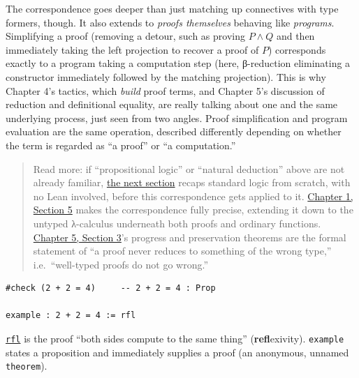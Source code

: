 The correspondence goes deeper than just matching up connectives with type formers, though. It also extends to \emph{proofs themselves} behaving like \emph{programs}. Simplifying a proof (removing a detour, such as proving \(P \wedge Q\) and then immediately taking the left projection to recover a proof of \(P\)) corresponds exactly to a program taking a computation step (here, β-reduction eliminating a constructor immediately followed by the matching projection). This is why Chapter 4's tactics, which \emph{build} proof terms, and Chapter 5's discussion of reduction and definitional equality, are really talking about one and the same underlying process, just seen from two angles. Proof simplification and program evaluation are the same operation, described differently depending on whether the term is regarded as ``a proof'' or ``a computation.''

\begin{quote}
Read more: if ``propositional logic'' or ``natural deduction'' above are not already familiar, \hyperref[sec:03-propositions-and-proofs:02-logic-recap:1]{the next section} recaps standard logic from scratch, with no Lean involved, before this correspondence gets applied to it. \hyperref[sec:01-basics:05-pi-sigma-and-coc:1]{Chapter 1, Section 5} makes the correspondence fully precise, extending it down to the untyped λ-calculus underneath both proofs and ordinary functions. \hyperref[sec:05-rigor-check:03-typing-rules-and-safety:1]{Chapter 5, Section 3}'s progress and preservation theorems are the formal statement of ``a proof never reduces to something of the wrong type,'' i.e.~``well-typed proofs do not go wrong.''
\end{quote}

\begin{lstlisting}
#check (2 + 2 = 4)     -- 2 + 2 = 4 : Prop

example : 2 + 2 = 4 := rfl
\end{lstlisting}

\href{https://lean-lang.org/doc/reference/latest/Tactic-Proofs/Tactic-Reference/}{\texttt{rfl}} is the proof ``both sides compute to the same thing'' (\textbf{refl}exivity). \texttt{example} states a proposition and immediately supplies a proof (an anonymous, unnamed \texttt{theorem}).

